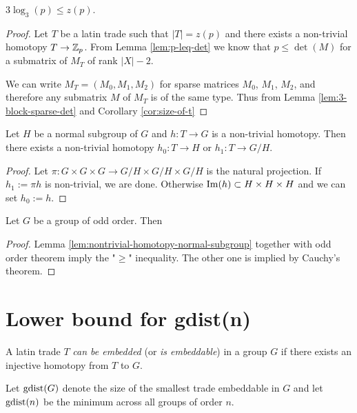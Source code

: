 \begin{lem}
\label{lem:lower-bound-zp}
$3 \log_3(p) \leq z(p)$.
\end{lem}%
\begin{proof}
Let $T$ be a latin trade such that $|T| = z(p)$ and there exists a non-trivial homotopy $T \rightarrow \mathbb Z_p$. From Lemma \ref{lem:p-leq-det} we know that $p \leq \det(M)$ for a submatrix of $M_T$ of rank $|X|-2$.

We can write $M_T = (M_0, M_1, M_2)$ for sparse matrices $M_0$, $M_1$, $M_2$, and therefore any submatrix $M$ of $M_T$ is of the same type. Thus from Lemma \ref{lem:3-block-sparse-det} and Corollary \ref{cor:size-of-t}
%
\end{proof}

\begin{lem}
\label{lem:nontrivial-homotopy-normal-subgroup}
Let $H$ be a normal subgroup of $G$ and $h: T \rightarrow G$ is a non-trivial homotopy. Then there exists a non-trivial homotopy $h_0: T \rightarrow H$ or $h_1: T \rightarrow G/H$.
\end{lem}
\begin{proof}
Let $\pi: G \times G \times G \rightarrow G/H \times G/H \times G/H$ is the natural projection. If $h_1 := \pi h$ is non-trivial, we are done. Otherwise $\mathop{\mathrm{Im}}(h) \subset H \times H \times H$ and we can set $h_0 := h$.
\end{proof}

\begin{lem}
\label{lem:zG-is-zp}
Let $G$ be a group of odd order. Then
%
\end{lem}
\begin{proof}
Lemma \ref{lem:nontrivial-homotopy-normal-subgroup} together with odd order theorem imply the "$\geq$" inequality. The other one is implied by Cauchy's theorem.
\end{proof}

\section{Lower bound for gdist(n)}

\begin{defn}
A latin trade $T$ \emph{can be embedded} (or \emph{is embeddable}) in a group $G$ if there exists an injective homotopy from $T$ to $G$.

Let \emph{$\mathop{\mathrm{gdist}}(G)$} denote the size of the smallest trade embeddable in $G$ and let \emph{$\mathop{\mathrm{gdist}}(n)$} be the minimum across all groups of order $n$.
\end{defn}

